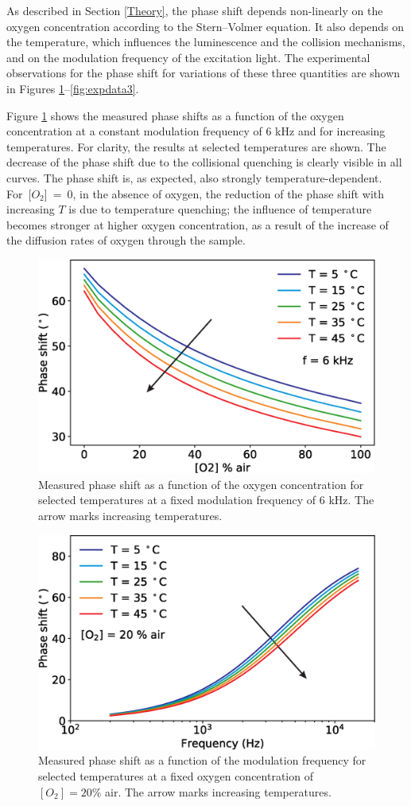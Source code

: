 \documentclass[sensors,article,accept,moreauthors,pdftex,10pt,a4paper]{Definitions/mdpi}
\theoremstyle{definition}
\begin{document}
As described in Section \ref{Theory}, the phase shift depends non-linearly on the oxygen concentration according to the Stern--Volmer equation. It also depends on the temperature, which influences the luminescence and the collision mechanisms, and on the modulation frequency of the excitation light. The experimental observations for the phase shift for variations of these three quantities are shown in Figures \ref{fig:expdata1}--\ref{fig:expdata3}.

Figure \ref{fig:expdata1} shows the measured phase shifts as a function of the oxygen concentration at a constant modulation frequency of 6 kHz and for increasing temperatures. For clarity, the results at selected temperatures are shown. The decrease of the phase shift due to the collisional quenching is clearly visible in all curves. The phase shift is, as expected, also strongly temperature-dependent. \mbox{For [$O_2$] = 0}, in the absence of oxygen, the reduction of the phase shift with increasing $T$ is due to temperature quenching; the influence of temperature becomes stronger at higher oxygen concentration, as a result of the increase of the diffusion rates of oxygen through the sample.

\begin{figure}[H]
\centering
\includegraphics[width=9 cm]{phase_O2_T.eps}
\caption{Measured phase shift as a function of the oxygen concentration for selected temperatures at a fixed modulation frequency of 6 kHz. The arrow marks increasing temperatures.}
\label{fig:expdata1}
\end{figure}
\unskip


\begin{figure}[H]
\centering
\includegraphics[width=9 cm]{phase_f_T.eps}
\caption{Measured phase shift as a function of the modulation frequency for selected temperatures at a fixed oxygen concentration of $[O_2]=20\%$ air. The arrow marks increasing temperatures.}
\label{fig:expdata2}
\end{figure}
\unskip
\end{document}
